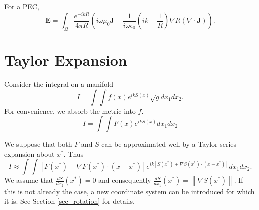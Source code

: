 \documentclass{article}
\newcommand{\norm}[1]{\left\lVert #1 \right\rVert}
\theoremstyle{plain}
\begin{document}
For a PEC,
\begin{equation}
	\mathbf{E} = \int_\Omega \frac{e^{-ikR}}{4\pi R}
	\left( i\omega\mu_0\mathbf{J} 
	- \frac{1}{i\omega\epsilon_0}\left( ik - \frac{1}{R} \right) \nabla R (\nabla\cdot\mathbf{J}) \right).
\end{equation}


\section{Taylor Expansion}\label{sec_taylor}


Consider the integral on a manifold
\begin{equation}
	I = \int\int f(x) e^{ikS(x)} \sqrt{g} dx_1dx_2.
\end{equation}
For convenience, we absorb the metric into $f$.
\begin{equation}
	I = \int\int F(x) e^{ikS(x)} dx_1dx_2
\end{equation}



We suppose that both $F$ and $S$ can be approximated well by a Taylor series expansion about $x^*$.
Thus
\begin{equation}
	I \approx \int\int \left[ F(x^*) + \nabla F(x^*) \cdot (x-x^*) \right] e^{ik\left[S(x^*) + \nabla S(x^*)\cdot (x-x^*) \right]} dx_1dx_2.
\end{equation}
We assume that $\frac{dS}{dx_2}(x^*) = 0$ and consequently $\frac{dS}{dx_1}(x^*) = \norm{\nabla S(x^*)}$.
If this is not already the case, a new coordinate system can be introduced for which it is. See Section \ref{sec_rotation} for details.
\end{document}
